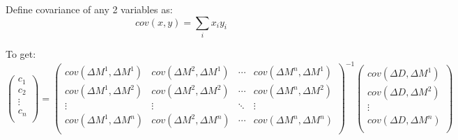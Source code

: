 Define covariance of any 2 variables as:
\begin{equation}
    cov(x, y) = \sum_i x_i y_i
\end{equation}

To get:
\begin{equation}
    \begin{pmatrix}
	c_1 \\
	c_2 \\
	\vdots	\\
	c_n \\ 
    \end{pmatrix}
    =
    \begin{pmatrix}
	cov(\Delta M^1, \Delta M^1) & cov(\Delta M^2, \Delta M^1)   & \cdots & cov(\Delta M^n, \Delta M^1)  \\
	cov(\Delta M^1, \Delta M^2) & cov(\Delta M^2, \Delta M^2)   & \cdots & cov(\Delta M^n, \Delta M^2)  \\
	\vdots	& \vdots    & \ddots	& \vdots    \\
	cov(\Delta M^1, \Delta M^n) & cov(\Delta M^2, \Delta M^n)   & \cdots & cov(\Delta M^n, \Delta M^n)  \\
    \end{pmatrix}^{-1}
    \begin{pmatrix}
	cov(\Delta D, \Delta M^1)   \\
	cov(\Delta D, \Delta M^2)   \\
	\vdots	\\
	cov(\Delta D, \Delta M^n)   \\
    \end{pmatrix}
\end{equation}

